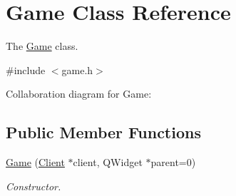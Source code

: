 \hypertarget{class_game}{}\section{Game Class Reference}
\label{class_game}


The \hyperlink{class_game}{Game} class.  




{\ttfamily \#include $<$game.\+h$>$}



Collaboration diagram for Game\+:
\subsection*{Public Member Functions}
\begin{DoxyCompactItemize}
\item 
\hyperlink{class_game_a9230840018c883f6b310fb9f1c4dd360}{Game} (\hyperlink{class_client}{Client} $\ast$client, Q\+Widget $\ast$parent=0)
\begin{DoxyCompactList}\small\item\em Constructor. \end{DoxyCompactList}\end{DoxyCompactItemize}
